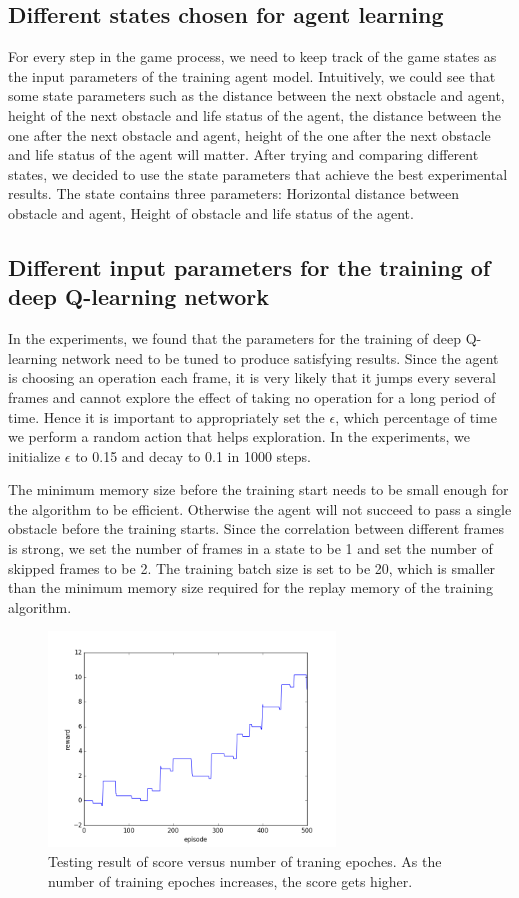 \documentclass{acmsiggraph}
\begin{document}
\subsection{Different states chosen for agent learning}
For every step in the game process, we need to keep track of the game states as the input parameters of the training agent model. Intuitively, we could see that some state parameters such as the distance between the next obstacle and agent, height of the next obstacle and life status of the agent, the distance between the one after the next obstacle and agent, height of the one after the next obstacle and life status of the agent will matter. After trying and comparing different states, we decided to use the state parameters that achieve the best experimental results. The state contains three parameters: Horizontal distance between obstacle and agent, Height of obstacle and life status of the agent.

\subsection{Different input parameters for the training of deep Q-learning network}
In the experiments, we found that the parameters for the training of deep Q-learning network need to be tuned to produce satisfying results. Since the agent is choosing an operation each frame, it is very likely that it jumps every several frames and cannot explore the effect of taking no operation for a long period of time. Hence it is important to appropriately set the $\epsilon$, which percentage of time we perform a random action that helps exploration. In the experiments, we initialize $\epsilon$ to 0.15 and decay to 0.1 in 1000 steps.

The minimum memory size before the training start needs to be small enough for the algorithm to be efficient. Otherwise the agent will not succeed to pass a single obstacle before the training starts. Since the correlation between different frames is strong, we set the number of frames in a state to be 1 and set the number of skipped frames to be 2. The training batch size is set to be 20, which is smaller than the minimum memory size required for the replay memory of the training algorithm.


\begin{figure}[ht]
  \centering
  \includegraphics[width=3.0in]{../fig/reward_in_testing_20000.png}
  \caption{Testing result of score versus number of traning epoches. As the number of training epoches increases, the score gets higher.}
  \label{fig:result}
\end{figure}
\end{document}

